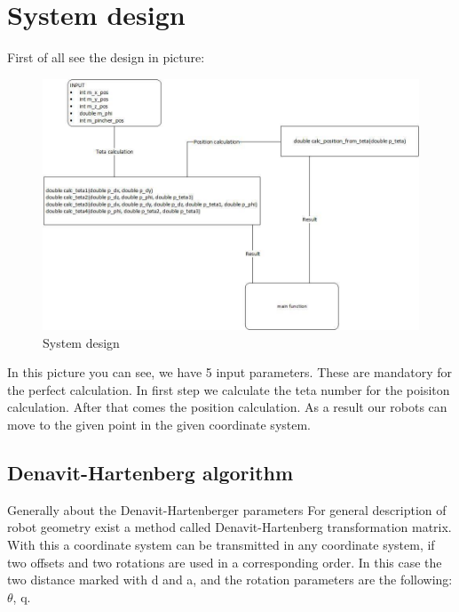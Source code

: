 \chapter{System design} \label{ch:sys_design}

	\hspace{15pt}First of all see the design in picture:

		\begin{figure}[H]
			\centering
			\includegraphics[width=\textwidth]{./images/system_design}
			\caption{System design}
		\end{figure}

	In this picture you can see, we have 5 input parameters. These are mandatory for the perfect calculation. In first step we calculate the teta number for the poisiton calculation. After that comes the position calculation. As a result our robots can move to the given point in the given coordinate system.
	
	\section{Denavit-Hartenberg algorithm }

	\hspace{15pt}Generally about the Denavit-Hartenberger parameters
For general description of robot geometry exist a method called Denavit-Hartenberg transformation matrix. With this a coordinate system can be transmitted in any coordinate system, if two offsets and two rotations are used in a corresponding order. In this case the two distance marked with d and a, and the rotation parameters are the following: $\theta$, q. \\




